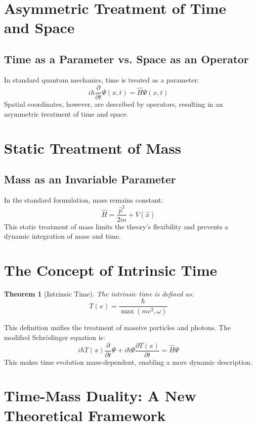 \documentclass[12pt,a4paper]{article}
\newcommand{\Tfield}{T(x)}
\newtheorem{theorem}{Theorem}[section]
\begin{document}
	\section{Asymmetric Treatment of Time and Space}
	\subsection{Time as a Parameter vs. Space as an Operator}
	In standard quantum mechanics, time is treated as a parameter:
	\begin{equation}
		i\hbar \frac{\partial}{\partial t}\Psi(x,t) = \hat{H}\Psi(x,t)
	\end{equation}
	Spatial coordinates, however, are described by operators, resulting in an asymmetric treatment of time and space.
	
	\section{Static Treatment of Mass}
	\subsection{Mass as an Invariable Parameter}
	In the standard formulation, mass remains constant:
	\begin{equation}
		\hat{H} = \frac{\hat{p}^2}{2m} + V(\hat{x})
	\end{equation}
	This static treatment of mass limits the theory’s flexibility and prevents a dynamic integration of mass and time.
	
	\section{The Concept of Intrinsic Time}
	\begin{theorem}[Intrinsic Time]
		The intrinsic time is defined as:
		\begin{equation}
			\Tfield = \frac{\hbar}{\max(m c^2, \omega)}
		\end{equation}
	\end{theorem}
	This definition unifies the treatment of massive particles and photons. The modified Schrödinger equation is:
	\begin{equation}
		i\hbar \Tfield \frac{\partial}{\partial t} \Psi + i\hbar \Psi \frac{\partial \Tfield}{\partial t} = \hat{H} \Psi
	\end{equation}
	This makes time evolution mass-dependent, enabling a more dynamic description.
	
	\section{Time-Mass Duality: A New Theoretical Framework}
\end{document}
